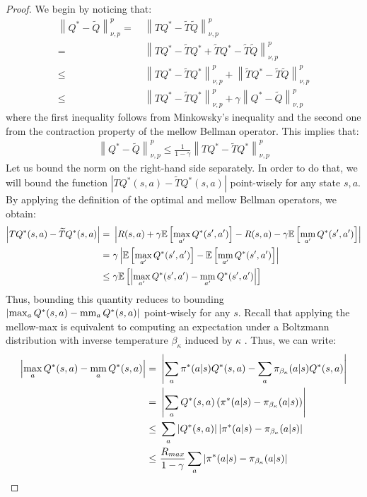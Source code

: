\documentclass{article}
\newcommand{\mm}{\operatornamewithlimits{mm}}
\newcommand{\wt}[1]{\widetilde{#1}}
\newcommand{\norm}[1]{\left\lVert #1 \right\rVert}
\newcommand{\abs}[1]{\left\lvert #1 \right\rvert}
\begin{document}
\thmm*
\begin{proof}
We begin by noticing that:
\begin{align*}
\norm{Q^*-\wt{Q}}_{\nu,p}^p =\ & \norm{TQ^* - \wt{T}\wt{Q}}_{\nu,p}^p \\ =\ &
\norm{TQ^* - \wt{T}Q^* + \wt{T}Q^* - \wt{T}\wt{Q}}_{\nu,p}^p \\ \leq\ &
\norm{TQ^* - \wt{T}Q^*}_{\nu,p}^p + \norm{\wt{T}Q^* - \wt{T}\wt{Q}}_{\nu,p}^p \\ \leq\ &
\norm{TQ^* - \wt{T}Q^*}_{\nu,p}^p + \gamma\norm{Q^* - \wt{Q}}_{\nu,p}^p
\end{align*}
where the first inequality follows from Minkowsky's inequality and the second one from the contraction property of the mellow Bellman operator. This implies that:
\begin{align} \label{eq:mm1}
\norm{Q^*-\wt{Q}}_{\nu,p}^p \leq \frac{1}{1-\gamma}\norm{TQ^* - \wt{T}Q^*}_{\nu,p}^p
\end{align}
Let us bound the norm on the right-hand side separately. In order to do that, we will bound the function $\abs{TQ^*(s,a) - \wt{T}Q^*(s,a)}$ point-wisely for any state $s,a$. By applying the definition of the optimal and mellow Bellman operators, we obtain:
\begin{align} \label{eq:mm5}
\abs{TQ^*(s,a) - \wt{T}Q^*(s,a)} =\ & \abs{R(s,a) + \gamma\mathbb{E}\left[\max_{a'}Q^*(s',a')\right] - R(s,a) - \gamma\mathbb{E}\left[\mm_{a'}Q^*(s',a')\right]}\notag \\ =\ & \gamma\abs{\mathbb{E}\left[\max_{a'}Q^*(s',a')\right] - \mathbb{E}\left[\mm_{a'}Q^*(s',a')\right]}\notag \\ \leq\ & \gamma\mathbb{E}\left[\abs{\max_{a'}Q^*(s',a') - \mm_{a'}Q^*(s',a')}\right]
\end{align}
Thus, bounding this quantity reduces to bounding $\abs{\max_{a}Q^*(s,a) - \mm_{a}Q^*(s,a)}$ point-wisely for any $s$. Recall that applying the mellow-max is equivalent to computing an expectation under a Boltzmann distribution with inverse temperature $\beta_{\kappa}$ induced by $\kappa$ \cite{}. Thus, we can write:
\begin{align} \label{eq:mm2}
\abs{\max_a Q^*(s,a) - \mm_a Q^*(s,a)} =\ & \abs{\sum_a \pi^*(a|s)Q^*(s,a) - \sum_a \pi_{\beta_{\kappa}}(a|s)Q^*(s,a)}\notag\\ =\ & \abs{\sum_a Q^*(s,a) \left( \pi^*(a|s) - \pi_{\beta_{\kappa}}(a|s)  \right)}\notag\\ \leq\ & \sum_a \abs{Q^*(s,a)} \abs{\pi^*(a|s) - \pi_{\beta_{\kappa}}(a|s)}\notag\\ \leq\ & \frac{R_{max}}{1-\gamma}\sum_a\abs{\pi^*(a|s) - \pi_{\beta_{\kappa}}(a|s)}

\end{align}
\end{proof}
\end{document}
